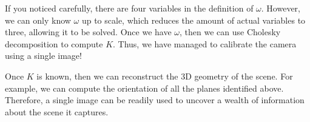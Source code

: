 \documentclass[a4paper, 12pt]{article}
\begin{document}
If you noticed carefully, there are four variables in the definition of $\omega$. However, we can only know $\omega$ up to scale, which reduces the amount of actual variables to three, allowing it to be solved. Once we have $\omega$, then we can use Cholesky decomposition to compute $K$. Thus, we have managed to calibrate the camera using a single image!

Once $K$ is known, then we can reconstruct the 3D geometry of the scene. For example, we can compute the orientation of all the planes identified above. Therefore, a single image can be readily used to uncover a wealth of information about the scene it captures.
\end{document}
